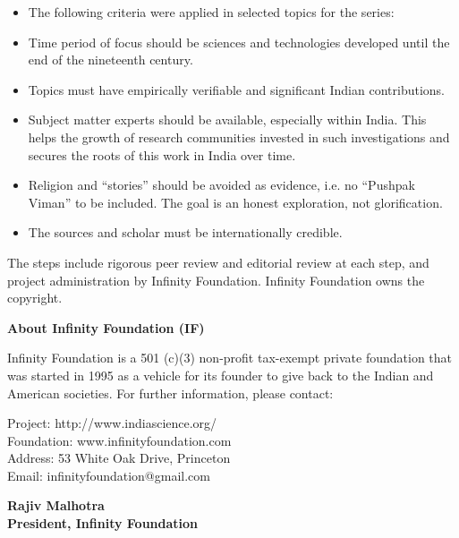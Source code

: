 \begin{itemize}
\itemsep=0pt
\item The following criteria were applied in selected topics for the series:

\item Time period of focus should be sciences and technologies developed until the end of the nineteenth century. 

\item Topics must have empirically verifiable and significant Indian contributions.

\item Subject matter experts should be available, especially within India. This helps the growth of research communities invested in such investigations and secures the roots of this work in India over time. 

\item Religion and “stories” should be avoided as evidence, i.e. no “Pushpak Viman” to be included. The goal is an honest exploration, not glorification. 

\item The sources and scholar must be internationally credible.

\end{itemize}

The steps include rigorous peer review and editorial review at each step, and project administration by Infinity Foundation. Infinity Foundation owns the copyright.


\textbf{About Infinity Foundation (IF)}

Infinity Foundation is a 501 (c)(3) non-profit tax-exempt private foundation that was started in 1995 as a vehicle for its founder to give back to the Indian and American societies. For further information, please contact:

Project: http://www.indiascience.org/\\
Foundation: www.infinityfoundation.com\\
Address: 53 White Oak Drive, Princeton\\
Email: infinityfoundation@gmail.com

\begin{flushright}
 \textbf{Rajiv Malhotra}\\
 \textbf{President, Infinity Foundation}
\end{flushright}

\label{endpreface3}
